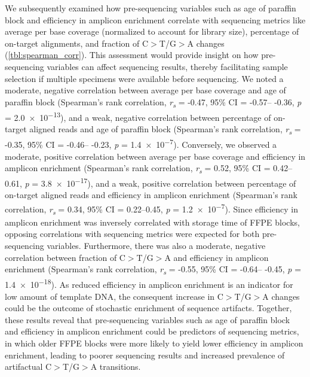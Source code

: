 We subsequently examined how pre-sequencing variables such as age of paraffin block and efficiency in amplicon enrichment correlate with sequencing metrics like average per base coverage (normalized to account for library size), percentage of on-target alignments, and fraction of C$>$T/G$>$A changes (\autoref{tbl:spearman_corr}). This assessment would provide insight on how pre-sequencing variables can affect sequencing results, thereby facilitating sample selection if multiple specimens were available before sequencing. We noted a moderate, negative correlation between average per base coverage and age of paraffin block (Spearman's rank correlation, \textit{r\textsubscript{s}} = -0.47, 95\% CI = -0.57-- -0.36, \textit{p} = \num{2.0e-13}), and a weak, negative correlation between percentage of on-target aligned reads and age of paraffin block (Spearman's rank correlation, \textit{r\textsubscript{s}} = -0.35, 95\% CI = -0.46-- -0.23, \textit{p} = \num{1.4e-7}). Conversely, we observed a moderate, positive correlation between average per base coverage and efficiency in amplicon enrichment (Spearman's rank correlation, \textit{r\textsubscript{s}} = 0.52, 95\% CI = 0.42--0.61, \textit{p} = \num{3.8e-17}), and a weak, positive correlation between percentage of on-target aligned reads and efficiency in amplicon enrichment (Spearman's rank correlation, \textit{r\textsubscript{s}} = 0.34, 95\% CI = 0.22--0.45, \textit{p} = \num{1.2e-7}). Since efficiency in amplicon enrichment was inversely correlated with storage time of FFPE blocks, opposing correlations with sequencing metrics were expected for both pre-sequencing variables. Furthermore, there was also a moderate, negative correlation between fraction of C$>$T/G$>$A and efficiency in amplicon enrichment (Spearman's rank correlation, \textit{r\textsubscript{s}} = -0.55, 95\% CI = -0.64-- -0.45, \textit{p} = \num{1.4e-18}). As reduced efficiency in amplicon enrichment is an indicator for low amount of template DNA, the consequent increase in C$>$T/G$>$A changes could be the outcome of stochastic enrichment of sequence artifacts. Together, these results reveal that pre-sequencing variables such as age of paraffin block and efficiency in amplicon enrichment could be predictors of sequencing metrics, in which older FFPE blocks were more likely to yield lower efficiency in amplicon enrichment, leading to poorer sequencing results and increased prevalence of artifactual C$>$T/G$>$A transitions.


